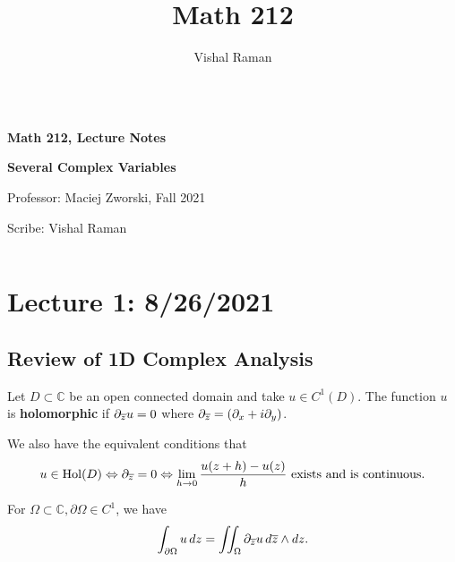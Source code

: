 \documentclass[11pt]{scrartcl}
\newcommand{\C}{\mathbb C}
\newcommand{\Hol}{\operatorname{Hol}}
\let \p \partial
\newcommand{\1}{\textbf{1}} %
\begin{document}
\title{Math 212}
\author{Vishal Raman}
\thispagestyle{empty}
$ $
\vfill
\begin{center}

\centerline{\huge \textbf{Math 212, Lecture Notes}}
\centerline{\Large \textbf{Several Complex Variables } }
\centerline{Professor: Maciej Zworski, Fall 2021}
\centerline{Scribe: Vishal Raman}
\end{center}
\vfill
$ $
\newpage
\thispagestyle{empty}
\tableofcontents
\newpage

\section{Lecture 1: 8/26/2021}
\subsection{Review of 1D Complex Analysis}
\begin{definition}[Holomorphic] Let $D \subset \C$ be an open connected domain and take $u \in C^1(D)$.  The function $u$ is \textbf{holomorphic} if $\partial_{\overline{z}} u = 0$ where $\partial_{\overline{z}} = (\partial_x + i\partial_y)$.
\end{definition}

We also have the equivalent conditions that 
$$u \in \Hol(D) \Leftrightarrow \p_{\ol{z}} = 0 \Leftrightarrow \lim_{h \to 0} \frac{u(z + h) - u(z)}{h} \text{ exists and is continuous.}$$

\begin{fact} For $\Omega \subset \C, \partial \Omega \in C^1$, we have 
$$\int_{\p \Omega} u\,dz = \iint_{\Omega} \p_{\ol{z}} u \, d\ol{z} \wedge dz.$$
\end{fact}
\end{document}
